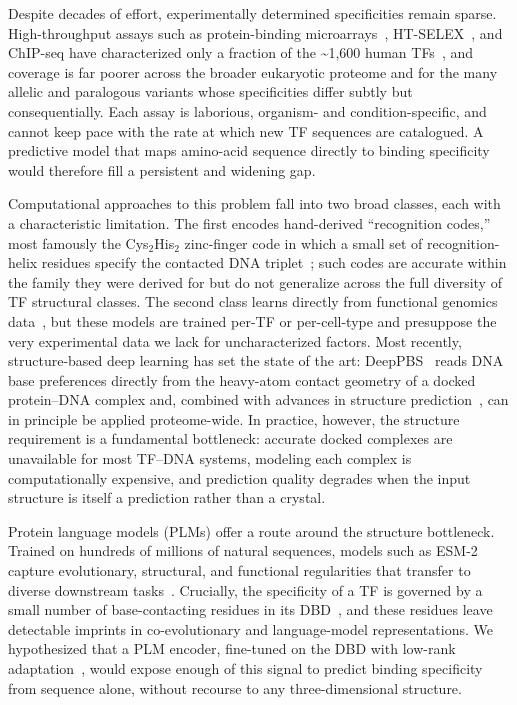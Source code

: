 \documentclass[11pt,letterpaper]{article}
\newcommand{\ts}{\textasciitilde}
\begin{document}
Despite decades of effort, experimentally determined specificities remain sparse.
High-throughput assays such as protein-binding microarrays~\cite{Berger2006},
HT-SELEX~\cite{Jolma2013}, and ChIP-seq have characterized only a fraction of the
\ts1,600 human TFs~\cite{Lambert2018,Vaquerizas2009}, and coverage is far poorer
across the broader eukaryotic proteome and for the many allelic and paralogous
variants whose specificities differ subtly but consequentially. Each assay is
laborious, organism- and condition-specific, and cannot keep pace with the rate at
which new TF sequences are catalogued. A predictive model that maps amino-acid
sequence directly to binding specificity would therefore fill a persistent and
widening gap.

Computational approaches to this problem fall into two broad classes, each with a
characteristic limitation. The first encodes hand-derived ``recognition codes,''
most famously the Cys$_2$His$_2$ zinc-finger code in which a small set of
recognition-helix residues specify the contacted DNA
triplet~\cite{Pavletich1991,Wolfe2000}; such codes are accurate within the family
they were derived for but do not generalize across the full diversity of TF
structural classes. The second class learns directly from functional genomics
data~\cite{Alipanahi2015,Zhou2017}, but these models are trained per-TF or
per-cell-type and presuppose the very experimental data we lack for uncharacterized
factors. Most recently, structure-based deep learning has set the state of the art:
DeepPBS~\cite{Mitra2024} reads DNA base preferences directly from the heavy-atom
contact geometry of a docked protein--DNA complex and, combined with advances in
structure prediction~\cite{Jumper2021}, can in principle be applied proteome-wide.
In practice, however, the structure requirement is a fundamental bottleneck:
accurate docked complexes are unavailable for most TF--DNA systems, modeling each
complex is computationally expensive, and prediction quality degrades when the
input structure is itself a prediction rather than a crystal.

Protein language models (PLMs) offer a route around the structure bottleneck.
Trained on hundreds of millions of natural sequences, models such as
ESM-2~\cite{Lin2023} capture evolutionary, structural, and functional regularities
that transfer to diverse downstream tasks~\cite{Elnaggar2022}. Crucially, the
specificity of a TF is governed by a small number of base-contacting residues in
its DBD~\cite{Najafabadi2015,Wolfe2000}, and these residues leave detectable
imprints in co-evolutionary and language-model representations. We hypothesized
that a PLM encoder, fine-tuned on the DBD with low-rank
adaptation~\cite{Hu2022}, would expose enough of this signal to predict binding
specificity from sequence alone, without recourse to any three-dimensional
structure.
\end{document}
